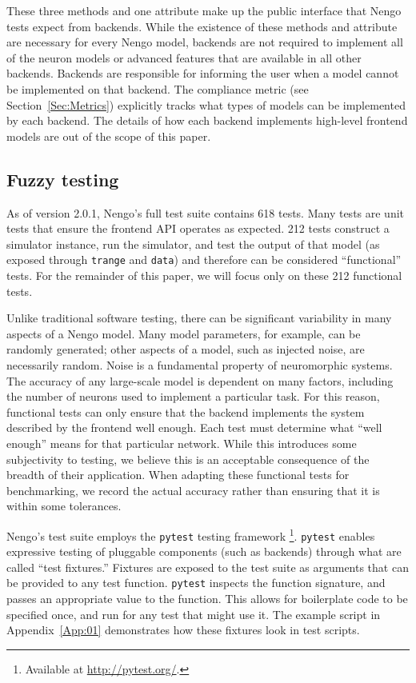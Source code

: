 \documentclass{frontiersSCNS}
\begin{document}
These three methods and one attribute
make up the public interface
that Nengo tests expect from backends.
While the existence of these methods
and attribute are necessary
for every Nengo model,
backends are not required
to implement all of the neuron models
or advanced features that
are available in all other backends.
Backends are responsible for informing
the user when a model cannot be implemented
on that backend.
The compliance metric (see Section~\ref{Sec:Metrics})
explicitly tracks what
types of models can be implemented
by each backend.
The details of how each backend
implements high-level frontend models
are out of the scope of this paper.

\subsection{Fuzzy testing}

As of version 2.0.1, Nengo's full test suite contains 618 tests.
Many tests are unit tests
that ensure the frontend API operates as expected.
212 tests construct a simulator instance,
run the simulator, and test the output of that model
(as exposed through \texttt{trange}
and \texttt{data})
and therefore can be considered ``functional'' tests.
For the remainder of this paper,
we will focus only on these 212 functional tests.

Unlike traditional software testing,
there can be significant variability
in many aspects of a Nengo model.
Many model parameters, for example,
can be randomly generated;
other aspects of a model,
such as injected noise,
are necessarily random.
Noise is a fundamental property
of neuromorphic systems.
The accuracy of any large-scale model
is dependent on many factors,
including the number of neurons used
to implement a particular task.
For this reason,
functional tests can only
ensure that the backend implements
the system described by the frontend
well enough.
Each test must determine what
``well enough'' means for that particular network.
While this introduces some subjectivity
to testing,
we believe this is an acceptable consequence
of the breadth of their application.
When adapting these functional tests for benchmarking,
we record the actual accuracy rather than
ensuring that it is within some tolerances.

Nengo's test suite employs the \texttt{pytest}
testing framework \footnote{Available at \url{http://pytest.org/}.}.
\texttt{pytest} enables
expressive testing of pluggable components
(such as backends)
through what are called ``test fixtures.''
Fixtures are exposed to the test suite
as arguments that can be provided
to any test function.
\texttt{pytest} inspects the function signature,
and passes an appropriate value
to the function.
This allows for boilerplate code
to be specified once,
and run for any test that might use it.
The example script in Appendix~\ref{App:01}
demonstrates how these fixtures
look in test scripts.
\end{document}

